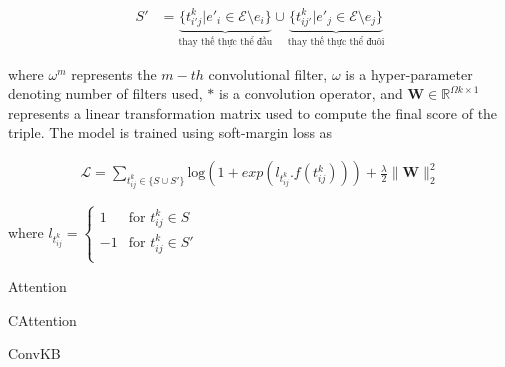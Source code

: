 \begin{align}
{S'}&={\underbrace{\{ t^k_{i'j} | e'_i \in \mathcal{E}\setminus e_i\}}_{\text{thay thế thực thể đầu}}\cup \underbrace{\{ t^k_{ij'} | e'_j \in \mathcal{E}\setminus e_j\}}_{\text{thay thế thực thể đuôi}}}
\end{align}

where $\omega^m$ represents the $m-th$ convolutional filter,
\(\omega\) is a hyper-parameter denoting number of filters
used, \(\ast\) is a convolution operator, and \(\mathbf{W} \in \mathbb{R}^{\Omega k \times 1}\)
represents a linear transformation matrix used to
compute the final score of the triple. The model is
trained using soft-margin loss as

\begin{align}
\mathcal{L} = \sum_{t^k_{ij} \in \{S \cup S'\}} \text{log}(1 + exp(l_{t^k_{ij}} . f(t^k_{ij}))) + \frac{\lambda}{2} \parallel{\mathbf{W}}\parallel_2^2
\end{align}

where $l_{t^k_{ij}} = \begin{cases}
1 &\text{for } t^k_{ij} \in S \\
-1 &\text{for } t^k_{ij} \in S' \\
\end{cases}$

Attention 

CAttention \cite{cordonnier2020multi}

ConvKB \cite{nguyen2017novel}

